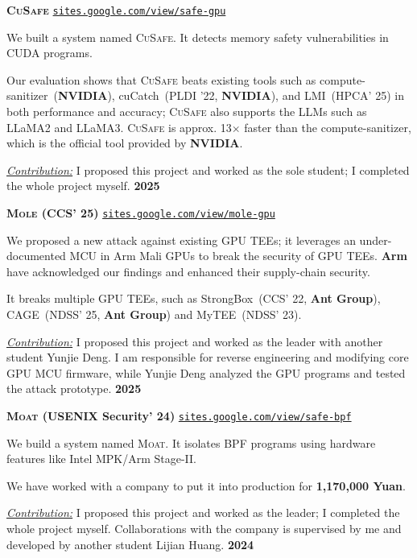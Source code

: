 \documentclass{resume}
\begin{document}
\begin{content}
	\textbf{\textsc{CuSafe}} \enspace
	{\href{https://sites.google.com/view/safe-gpu/}{\texttt{sites.google.com/view/safe-gpu}}}

	{We built a system named \textsc{CuSafe}. It detects memory safety vulnerabilities in CUDA programs.}

	{Our evaluation shows that \textsc{CuSafe} beats existing tools such as compute-sanitizer~(\textbf{NVIDIA}), cuCatch~(PLDI '22, \textbf{NVIDIA}), and LMI~(HPCA' 25) in both performance and accuracy; \textsc{CuSafe} also supports the LLMs such as LLaMA2 and LLaMA3. \textsc{CuSafe} is approx. 13$\times$ faster than the compute-sanitizer, which is the official tool provided by \textbf{NVIDIA}.}

	{\underline{\textit{Contribution:}} I proposed this project and worked as the sole student; I completed the whole project myself.}
	\hfill {\bf 2025}


	{\bf \textbf{\textsc{Mole}} (CCS' 25)} \enspace
	{\href{https://sites.google.com/view/mole-gpu}{\texttt{sites.google.com/view/mole-gpu}}}

	{We proposed a new attack against existing GPU TEEs; it leverages an under-documented MCU in Arm Mali GPUs to break the security of GPU TEEs. \textbf{Arm} have acknowledged our findings and enhanced their supply-chain security.}

	{It breaks multiple GPU TEEs, such as StrongBox~(CCS' 22, \textbf{Ant Group}), CAGE~(NDSS' 25, \textbf{Ant Group}) and MyTEE~(NDSS' 23).}

	{\underline{\textit{Contribution:}} I proposed this project and worked as the leader with another student Yunjie Deng. I am responsible for reverse engineering and modifying core GPU MCU firmware, while Yunjie Deng analyzed the GPU programs and tested the attack prototype.}
	\hfill{\bf 2025}


	{\bf \textbf{\textsc{Moat}} (USENIX Security' 24)} \enspace
	{\href{https://sites.google.com/view/safe-bpf/}{\texttt{sites.google.com/view/safe-bpf}}}

	{We build a system named \textsc{Moat}. It isolates BPF programs using hardware features like Intel MPK/Arm Stage-II.}

	{We have worked with a company to put it into production for \textbf{1,170,000 Yuan}.}

	{\underline{\textit{Contribution:}} I proposed this project and worked as the leader; I completed the whole project myself. Collaborations with the company is supervised by me and developed by another student Lijian Huang.}
	\hfill {\bf 2024}


\end{content}
\end{document}
